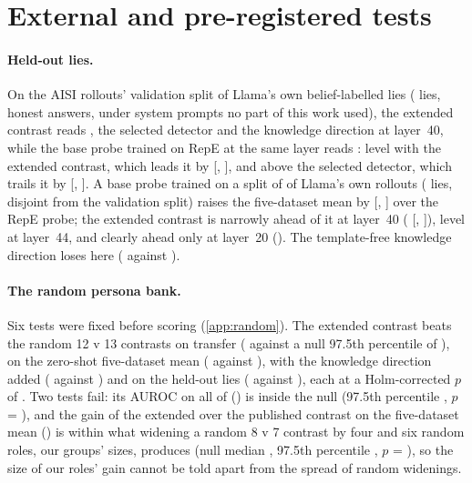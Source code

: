 \section{External and pre-registered tests}
\label{sec:external}

\paragraph{Held-out lies.} On the AISI rollouts' validation split of Llama's own belief-labelled lies
( lies,  honest answers, under system prompts no part of this
work used), the extended contrast reads , the selected detector  and the knowledge
direction  at layer~40, while the base probe trained on RepE at the same layer reads :
level with the extended contrast, which leads it by  [, ], and above
the selected detector, which trails it by  [, ]. A
base probe trained on a split of  of Llama's own rollouts (
lies, disjoint from the validation split) raises the five-dataset mean by 
[, ] over the RepE probe; the extended contrast is narrowly
ahead of it at layer~40 ( [, ]), level at
layer~44, and clearly ahead only at layer~20 (). The template-free knowledge direction
loses here ( against ).

\paragraph{The random persona bank.} Six tests were fixed before scoring (\cref{app:random}). The extended
contrast beats the random 12 v 13 contrasts on transfer ( against a null 97.5th percentile of
), on the zero-shot five-dataset mean ( against ), with the
knowledge direction added ( against ) and on the held-out lies (
against ), each at a Holm-corrected $p$ of . Two tests fail: its AUROC on all of
\hpkr{} () is inside the null (97.5th percentile , $p$ = ), and the
gain of the extended over the published contrast on the five-dataset mean () is within what
widening a random 8 v 7 contrast by four and six random roles, our groups' sizes, produces (null median
, 97.5th percentile , $p$ = ), so the size of our roles' gain
cannot be told apart from the spread of random widenings.

